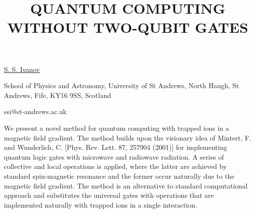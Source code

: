 \title{QUANTUM COMPUTING WITHOUT TWO-QUBIT GATES}

\underline{S. S. Ivanov}

{\normalsize{
\vspace{-4mm} School of Physics and Astronomy, University of St Andrews, North Haugh, St Andrews, Fife, KY16 9SS, Scotland


\email ssi@st-andrews.ac.uk}}

We present a novel method for quantum computing with trapped ions in a magnetic field gradient. The method builds upon the visionary idea of Mintert, F. and Wunderlich, C. [Phys. Rev. Lett. 87, 257904 (2001)] for implementing quantum logic gates with microwave and radiowave radiation. A series of collective and local operations is applied, where the latter are achieved by standard spin-magnetic resonance and the former occur naturally due to the magnetic field gradient. The method is an alternative to standard computational approach and substitutes the universal gates with operations that are implemented naturally with trapped ions in a single interaction.

\vspace{\baselineskip}
